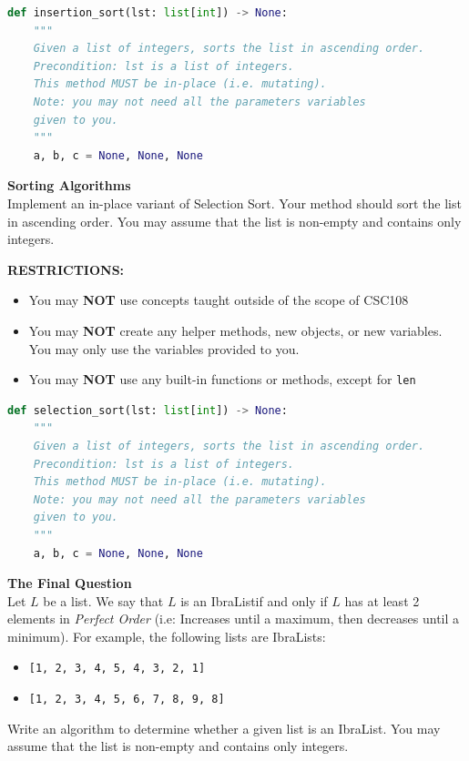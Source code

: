 \documentclass[letterpaper,13pt,addpoints]{exam}
\begin{document}
\begin{questions}
\begin{lstlisting}[language=Python, style=mystyle]
def insertion_sort(lst: list[int]) -> None:
    """
    Given a list of integers, sorts the list in ascending order.
    Precondition: lst is a list of integers.
    This method MUST be in-place (i.e. mutating).
    Note: you may not need all the parameters variables
    given to you.
    """
    a, b, c = None, None, None
    \end{lstlisting}
\clearpage
\question[10] \textbf{Sorting Algorithms} \\
Implement an in-place variant of Selection Sort. Your method should sort the list in ascending order. You may assume that the list is non-empty and contains only integers.
\begin{center}
    \textbf{RESTRICTIONS:}
    \begin{itemize}
        \item You may \textbf{NOT} use concepts taught outside of the scope of CSC108
        \item You may \textbf{NOT} create any helper methods, new objects, or new variables.
              You may only use the variables provided to you.
        \item You may \textbf{NOT} use any built-in functions or methods, except for
              \texttt{len}
    \end{itemize}
\end{center}
\begin{lstlisting}[language=Python, style=mystyle]
def selection_sort(lst: list[int]) -> None:
    """
    Given a list of integers, sorts the list in ascending order.
    Precondition: lst is a list of integers.
    This method MUST be in-place (i.e. mutating).
    Note: you may not need all the parameters variables
    given to you.
    """
    a, b, c = None, None, None
\end{lstlisting}
\clearpage
\textbf{The Final Question} \\
Let $L$ be a list. We say that $L$ is an IbraList\texttrademark if and only if $L$ has at least 2 elements in \textit{Perfect Order} (i.e: Increases until a maximum, then decreases until a minimum). For example, the following lists are IbraLists:
\begin{itemize}
    \item \texttt{[1, 2, 3, 4, 5, 4, 3, 2, 1]}
    \item \texttt{[1, 2, 3, 4, 5, 6, 7, 8, 9, 8]}
\end{itemize}
Write an algorithm to determine whether a given list is an IbraList\texttrademark. You may assume that the list is non-empty and contains only integers.

\end{questions}
\end{document}
